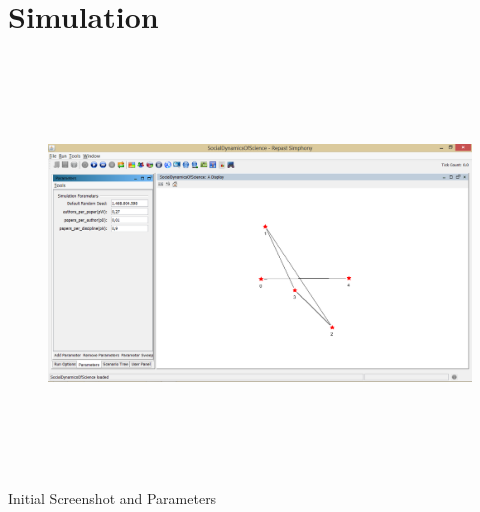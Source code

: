 \chapter{Simulation}
\begin{figure}[H]
    \includegraphics[height= 11cm, width=17cm]{project/images/parameters.png}
\end{figure}
\small{Initial Screenshot and Parameters}
